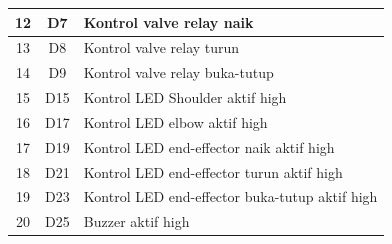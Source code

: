 \begin{table}[H]
\begin{tabular}{|c|c|l|}
		12 & D7                                                                & Kontrol valve relay naik                            \\ \hline
		13 & D8                                                                & Kontrol valve relay turun                           \\ \hline
		14 & D9                                                                & Kontrol valve relay buka-tutup                      \\ \hline
		15 & D15                                                               & Kontrol LED Shoulder aktif high                     \\ \hline
		16 & D17                                                               & Kontrol LED elbow aktif high                        \\ \hline
		17 & D19                                                               & Kontrol LED end-effector naik aktif high            \\ \hline
		18 & D21                                                               & Kontrol LED end-effector turun aktif high           \\ \hline
		19 & D23                                                               & Kontrol LED end-effector buka-tutup aktif high      \\ \hline
		20 & D25                                                               & Buzzer aktif high                                   \\ \hline
	\end{tabular}
\end{table}





